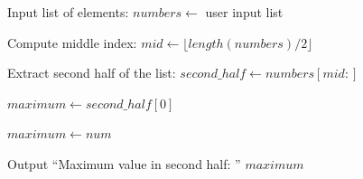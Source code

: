 \begin{algorithm}
\caption{Find Maximum Value in the Second Half of a List}
\begin{algorithmic}[1]

\STATE Input list of elements:
\STATE $numbers \gets$ user input list

\STATE Compute middle index:
\STATE $mid \gets \lfloor length(numbers)/2 \rfloor$

\STATE Extract second half of the list:
\STATE $second\_half \gets numbers[mid:]$

\STATE $maximum \gets second\_half[0]$

        \STATE $maximum \gets num$
    \ENDIF
\ENDFOR

\STATE Output ``Maximum value in second half: '' $maximum$

\end{algorithmic}
\end{algorithm}